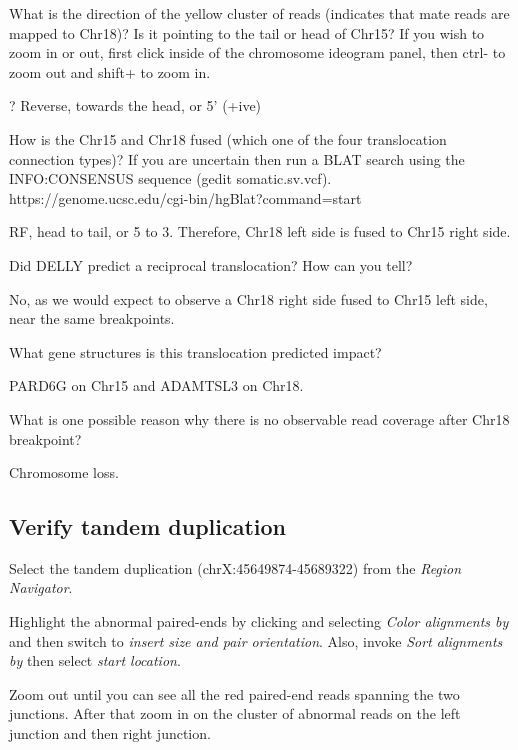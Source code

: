 \begin{questions}
What is the direction of the yellow cluster of reads (indicates that mate reads are mapped to Chr18)? Is it pointing to the tail or head of Chr15? \newline
If you wish to zoom in or out, first click inside of the chromosome ideogram panel, then ctrl- to zoom out and shift+ to zoom in. 
\begin{answer}
? Reverse, towards the head, or 5’ (+ive)
\end{answer}
\end{questions}

\begin{questions}
How is the Chr15 and Chr18 fused (which one of the four translocation connection types)? \newline
If you are uncertain then run a BLAT search using the INFO:CONSENSUS sequence (gedit  somatic.sv.vcf). https://genome.ucsc.edu/cgi-bin/hgBlat?command=start
\begin{answer}
RF, head to tail, or 5 to 3. Therefore, Chr18 left side is fused to Chr15 right side.
\end{answer}
Did DELLY predict a reciprocal translocation? How can you tell? 
\begin{answer}
No, as we would expect to observe a Chr18 right side fused to Chr15 left side, near the same breakpoints.  
\end{answer}
What gene structures is this translocation predicted impact? 
\begin{answer}
PARD6G on Chr15 and ADAMTSL3 on Chr18.
\end{answer}
What is one possible reason why there is no observable read coverage after Chr18 breakpoint? 
\begin{answer}
Chromosome loss.
\end{answer}
\end{questions}

\subsection{Verify tandem duplication}
\begin{advanced}
\begin{steps}
Select the tandem duplication (chrX:45649874-45689322) from the \emph{Region Navigator}.

Highlight the abnormal paired-ends by clicking and selecting \emph{Color alignments by} and then switch to \emph{insert size and pair orientation}. Also, invoke \emph{Sort alignments by} then select \emph{start location}.

Zoom out until you can see all the red paired-end reads spanning the two junctions. After that zoom in on the cluster of abnormal reads on the left junction and then right junction.
\end{steps}
\end{advanced}

